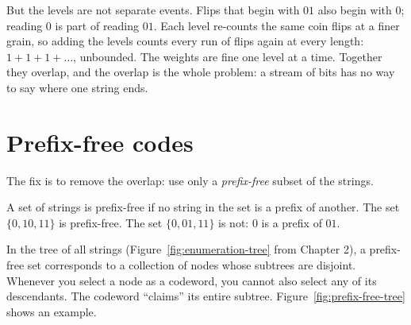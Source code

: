 But the levels are not separate events. Flips that begin with $01$ also begin with $0$; reading $0$ is part of reading $01$. Each level re-counts the same coin flips at a finer grain, so adding the levels counts every run of flips again at every length: $1 + 1 + 1 + \dots$, unbounded. The weights are fine one level at a time. Together they overlap, and the overlap is the whole problem: a stream of bits has no way to say where one string ends.

\section*{Prefix-free codes}

The fix is to remove the overlap: use only a \emph{prefix-free} subset of the strings.

A set of strings is prefix-free if no string in the set is a prefix of another. The set $\{0, 10, 11\}$ is prefix-free. The set $\{0, 01, 11\}$ is not: $0$ is a prefix of $01$.

In the tree of all strings (Figure~\ref{fig:enumeration-tree} from Chapter 2), a prefix-free set corresponds to a collection of nodes whose subtrees are disjoint. Whenever you select a node as a codeword, you cannot also select any of its descendants. The codeword ``claims'' its entire subtree. Figure~\ref{fig:prefix-free-tree} shows an example.

